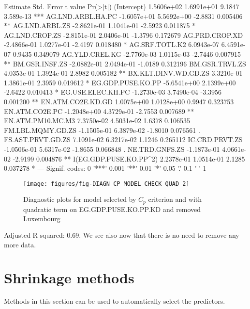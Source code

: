\documentclass[a4paper]{article}
\begin{document}
\begin{Schunk}
\begin{Soutput}
                          Estimate  Std. Error t value  Pr(>|t|)    
(Intercept)             1.5606e+02  1.6991e+01  9.1847 3.589e-13 ***
AG.LND.ARBL.HA.PC      -1.6057e+01  5.5692e+00 -2.8831  0.005406 ** 
AG.LND.ARBL.ZS         -2.8621e-01  1.1041e-01 -2.5923  0.011875 *  
AG.LND.CROP.ZS         -2.8151e-01  2.0406e-01 -1.3796  0.172679    
AG.PRD.CROP.XD         -2.4866e-01  1.0277e-01 -2.4197  0.018480 *  
AG.SRF.TOTL.K2          6.0943e-07  6.4591e-07  0.9435  0.349079    
AG.YLD.CREL.KG         -2.7760e-03  1.0115e-03 -2.7446  0.007915 ** 
BM.GSR.INSF.ZS         -2.0882e-01  2.0494e-01 -1.0189  0.312196    
BM.GSR.TRVL.ZS          4.0353e-01  1.3924e-01  2.8982  0.005182 ** 
BX.KLT.DINV.WD.GD.ZS    3.3210e-01  1.3861e-01  2.3959  0.019612 *  
EG.GDP.PUSE.KO.PP      -5.6541e+00  2.1399e+00 -2.6422  0.010413 *  
EG.USE.ELEC.KH.PC      -1.2730e-03  3.7490e-04 -3.3956  0.001200 ** 
EN.ATM.CO2E.KD.GD       1.0075e+00  1.0128e+00  0.9947  0.323753    
EN.ATM.CO2E.PC         -1.2048e+00  4.3729e-01 -2.7553  0.007689 ** 
EN.ATM.PM10.MC.M3       7.3750e-02  4.5031e-02  1.6378  0.106535    
FM.LBL.MQMY.GD.ZS      -1.1505e-01  6.3879e-02 -1.8010  0.076561 .  
FS.AST.PRVT.GD.ZS       7.1091e-02  6.3217e-02  1.1246  0.265112    
IC.CRD.PRVT.ZS         -1.0506e-01  5.6317e-02 -1.8655  0.066848 .  
NE.TRD.GNFS.ZS         -1.1873e-01  4.0661e-02 -2.9199  0.004876 ** 
I(EG.GDP.PUSE.KO.PP^2)  2.2378e-01  1.0514e-01  2.1285  0.037278 *  
---
Signif. codes:  0 '***' 0.001 '**' 0.01 '*' 0.05 '.' 0.1 ' ' 1
\end{Soutput}
\end{Schunk}
		
\begin{figure}[H]
\begin{center}
\texttt{[image: figures/fig-DIAGN\_CP\_MODEL\_CHECK\_QUAD\_2]}
\caption{Diagnostic plots for model selected by $C_p$ criterion
and with quadratic term on EG.GDP.PUSE.KO.PP.KD and removed Luxembourg}
\end{center}
\end{figure}
Adjusted R-squared:
0.69. We see also now
that there is no need to remove any more data.

\section{Shrinkage methods}
Methods in this section can be used to automatically select the predictors. 
\end{document}
